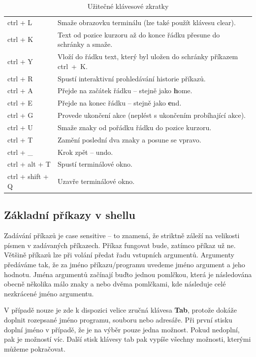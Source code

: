 \documentclass{article}
\begin{document}
\begin{table}[H]
\begin{tabular}{l l}
ctrl + L & Smaže obrazovku terminálu (lze také použít klávesu clear).\\
ctrl + K & Text od pozice kurzoru až do konce řádku přesune do schránky a smaže.\\
ctrl + Y & Vloží do řádku text, který byl uložen do schránky příkazem ctrl~+~K.\\
ctrl + R & Spustí interaktivní prohledávání historie příkazů.\\
ctrl + A & Přejde na začátek řádku -- stejně jako {\textbf home}.\\
ctrl + E & Přejde na konec řádku -- stejně jako {\textbf end}.\\
ctrl + G & Provede ukončení akce (neplést s ukončením probíhající akce).\\
ctrl + U & Smaže znaky od pořádku řádku do pozice kurzoru.\\
ctrl + T & Zamění poslední dva znaky a posune se vpravo.\\
ctrl + \_ & Krok zpět -- undo.\\
ctrl + alt + T & Spustí terminálové okno.\\
ctrl + shift + Q & Uzavře terminálové okno.
\end{tabular}
\caption{Užitečné klávesové zkratky}
\label{tab:shortcuts}
\end{table}

\subsection{Základní příkazy v shellu}
Zadávání příkazů je case sensitive -- to znamená, že striktně záleží na velikosti písmen v zadávaných příkazech. Příkaz  fungovat bude, zatímco příkaz  už ne. Většině příkazů lze při volání předat řadu vstupních argumentů. Argumenty předáváme tak, že za jméno příkazu/programu uvedeme jméno argument a jeho hodnotu. Jména argumentů začínají buďto jednou pomlčkou, která je následována obecně několika málo znaky a nebo dvěma pomlčkami, kde následuje celé nezkrácené jméno argumentu.

V případě nouze je zde k dispozici velice zručná klávesa \textbf{Tab}, protože dokáže doplnit rozepsané jméno programu, souboru nebo adresáře. Při první stisku doplní jméno v případě, že je na výběr pouze jedna možnost. Pokud nedoplní, pak je možností víc. Další stisk klávesy tab pak vypíše všechny možnosti, kterými můžeme pokračovat. 
\end{document}
